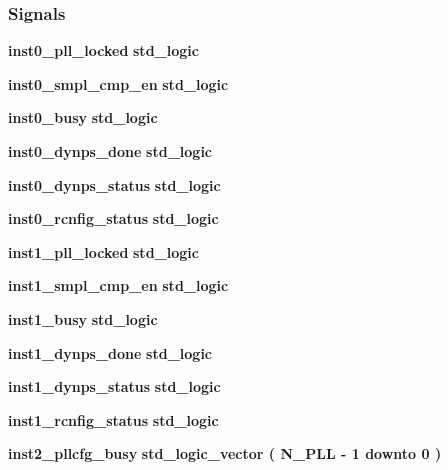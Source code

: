 \subsubsection*{Signals}
 \begin{DoxyCompactItemize}
\item 
{\bf inst0\+\_\+pll\+\_\+locked} {\bfseries \textcolor{comment}{std\+\_\+logic}\textcolor{vhdlchar}{ }} 
\item 
{\bf inst0\+\_\+smpl\+\_\+cmp\+\_\+en} {\bfseries \textcolor{comment}{std\+\_\+logic}\textcolor{vhdlchar}{ }} 
\item 
{\bf inst0\+\_\+busy} {\bfseries \textcolor{comment}{std\+\_\+logic}\textcolor{vhdlchar}{ }} 
\item 
{\bf inst0\+\_\+dynps\+\_\+done} {\bfseries \textcolor{comment}{std\+\_\+logic}\textcolor{vhdlchar}{ }} 
\item 
{\bf inst0\+\_\+dynps\+\_\+status} {\bfseries \textcolor{comment}{std\+\_\+logic}\textcolor{vhdlchar}{ }} 
\item 
{\bf inst0\+\_\+rcnfig\+\_\+status} {\bfseries \textcolor{comment}{std\+\_\+logic}\textcolor{vhdlchar}{ }} 
\item 
{\bf inst1\+\_\+pll\+\_\+locked} {\bfseries \textcolor{comment}{std\+\_\+logic}\textcolor{vhdlchar}{ }} 
\item 
{\bf inst1\+\_\+smpl\+\_\+cmp\+\_\+en} {\bfseries \textcolor{comment}{std\+\_\+logic}\textcolor{vhdlchar}{ }} 
\item 
{\bf inst1\+\_\+busy} {\bfseries \textcolor{comment}{std\+\_\+logic}\textcolor{vhdlchar}{ }} 
\item 
{\bf inst1\+\_\+dynps\+\_\+done} {\bfseries \textcolor{comment}{std\+\_\+logic}\textcolor{vhdlchar}{ }} 
\item 
{\bf inst1\+\_\+dynps\+\_\+status} {\bfseries \textcolor{comment}{std\+\_\+logic}\textcolor{vhdlchar}{ }} 
\item 
{\bf inst1\+\_\+rcnfig\+\_\+status} {\bfseries \textcolor{comment}{std\+\_\+logic}\textcolor{vhdlchar}{ }} 
\item 
{\bf inst2\+\_\+pllcfg\+\_\+busy} {\bfseries \textcolor{comment}{std\+\_\+logic\+\_\+vector}\textcolor{vhdlchar}{ }\textcolor{vhdlchar}{(}\textcolor{vhdlchar}{ }\textcolor{vhdlchar}{ }\textcolor{vhdlchar}{ }\textcolor{vhdlchar}{ }{\bfseries {\bf N\+\_\+\+P\+LL}} \textcolor{vhdlchar}{-\/}\textcolor{vhdlchar}{ } \textcolor{vhdldigit}{1} \textcolor{vhdlchar}{ }\textcolor{keywordflow}{downto}\textcolor{vhdlchar}{ }\textcolor{vhdlchar}{ } \textcolor{vhdldigit}{0} \textcolor{vhdlchar}{ }\textcolor{vhdlchar}{)}\textcolor{vhdlchar}{ }} 

\end{DoxyCompactItemize}
